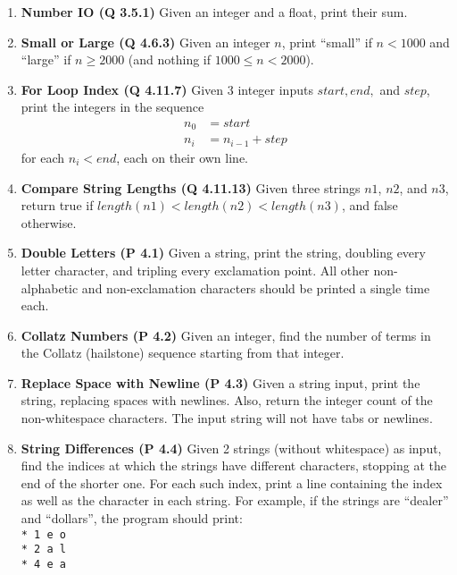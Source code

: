 \documentclass{sig-alternate}
\begin{document}
\begin{enumerate}
\item
\textbf{Number IO (Q 3.5.1)}
Given an integer and a float, print their sum.

\item
\textbf{Small or Large (Q 4.6.3)}
Given an integer $n$, print ``small'' if $n < 1000$ and ``large'' if $n \ge 2000$ (and nothing if $1000 \le n < 2000$).

\item
\textbf{For Loop Index (Q 4.11.7)}
Given 3 integer inputs $start, end,$ and $step$, print the integers in the sequence
\begin{align*}
n_0 &= start \\
n_i &= n_{i-1} + step
\end{align*}
for each $n_i < end$, each on their own line.

\item
\textbf{Compare String Lengths (Q 4.11.13)}
Given three strings $n1$, $n2$, and $n3$, return true if $length(n1) < length(n2) < length(n3)$, and false otherwise.

\item
\textbf{Double Letters (P 4.1)}
Given a string, print the string, doubling every letter character, and tripling every exclamation point. All other non-alphabetic and non-exclamation characters should be printed a single time each.

\item
\textbf{Collatz Numbers (P 4.2)}
Given an integer, find the number of terms in the Collatz (hailstone) sequence starting from that integer.

\item
\textbf{Replace Space with Newline (P 4.3)}
Given a string input, print the string, replacing spaces with newlines. Also, return the integer count of the non-whitespace characters. The input string will not have tabs or newlines.

\item
\textbf{String Differences (P 4.4)}
Given 2 strings (without whitespace) as input, find the indices at which the strings have different characters, stopping at the end of the shorter one. For each such index, print a line containing the index as well as the character in each string. For example, if the strings are ``dealer'' and ``dollars'', the program should print:
\texttt{\\*
\hspace*{1cm}1 e o \\*
\hspace*{1cm}2 a l \\*
\hspace*{1cm}4 e a
}


\end{enumerate}
\end{document}

